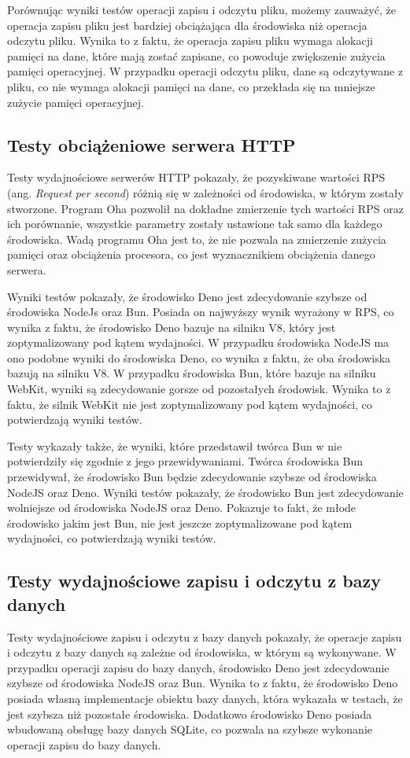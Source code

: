 Porównując wyniki testów operacji zapisu i odczytu pliku, możemy zauważyć, że operacja zapisu pliku jest bardziej obciążająca dla środowiska niż operacja odczytu pliku. Wynika to z faktu, że operacja zapisu pliku wymaga alokacji pamięci na dane, które mają zostać zapisane, co powoduje zwiększenie zużycia pamięci operacyjnej. W przypadku operacji odczytu pliku, dane są odczytywane z pliku, co nie wymaga alokacji pamięci na dane, co przekłada się na mniejsze zużycie pamięci operacyjnej.

\subsection{Testy obciążeniowe serwera HTTP}
Testy wydajnościowe serwerów HTTP pokazały, że pozyskiwane wartości RPS (ang. \textit{Request per second}) różnią się w zależności od środowiska, w którym zostały stworzone. Program Oha \cite{oha} pozwolił na dokładne zmierzenie tych wartości RPS oraz ich porównanie, wszystkie parametry zostały ustawione tak samo dla każdego środowiska. Wadą programu Oha jest to, że nie pozwala na zmierzenie zużycia pamięci oraz obciążenia procesora, co jest wyznacznikiem obciążenia danego serwera.

Wyniki testów pokazały, że środowisko Deno jest zdecydowanie szybsze od środowiska NodeJs oraz Bun. Posiada on najwyższy wynik wyrażony w RPS, co wynika z faktu, że środowisko Deno bazuje na silniku V8, który jest zoptymalizowany pod kątem wydajności. W przypadku środowiska NodeJS ma ono podobne wyniki do środowiska Deno, co wynika z faktu, że oba środowiska bazują na silniku V8. W przypadku środowiska Bun, które bazuje na silniku WebKit, wyniki są zdecydowanie gorsze od pozostałych środowisk. Wynika to z faktu, że silnik WebKit nie jest zoptymalizowany pod kątem wydajności, co potwierdzają wyniki testów.

Testy wykazały także, że wyniki, które przedstawił twórca Bun w \cite{bun_test} nie potwierdziły się zgodnie z jego przewidywaniami. Twórca środowiska Bun przewidywał, że środowisko Bun będzie zdecydowanie szybsze od środowiska NodeJS oraz Deno. Wyniki testów pokazały, że środowisko Bun jest zdecydowanie wolniejsze od środowiska NodeJS oraz Deno. Pokazuje to fakt, że młode środowisko jakim jest Bun, nie jest jeszcze zoptymalizowane pod kątem wydajności, co potwierdzają wyniki testów.

\subsection{Testy wydajnościowe zapisu i odczytu z bazy danych}
Testy wydajnościowe zapisu i odczytu z bazy danych pokazały, że operacje zapisu i odczytu z bazy danych są zależne od środowiska, w którym są wykonywane. W przypadku operacji zapisu do bazy danych, środowisko Deno jest zdecydowanie szybsze od środowiska NodeJS oraz Bun. Wynika to z faktu, że środowisko Deno posiada własną implementacje obiektu bazy danych, która wykazała w testach, że jest szybsza niż pozostałe środowiska. Dodatkowo środowisko Deno posiada wbudowaną obsługę bazy danych SQLite, co pozwala na szybsze wykonanie operacji zapisu do bazy danych.

